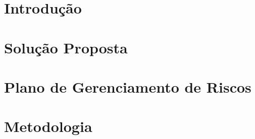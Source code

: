 % 



\chapter{Introdução} %


\chapter{Solução Proposta} %

\label{cha:solucao}


\chapter{Plano de Gerenciamento de Riscos}



\chapter{Metodologia}

